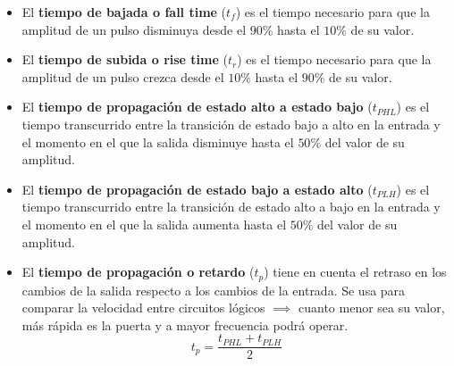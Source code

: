 \documentclass[10pt,a4paper]{article}
\begin{document}
	\begin{itemize}
		\item El \textbf{tiempo de bajada o fall time} ($t_f$) es el tiempo necesario para que la amplitud de un pulso disminuya desde el $90\%$ hasta el $10\%$ de su valor.
		\item El \textbf{tiempo de subida o rise time} ($t_r$) es el tiempo necesario para que la amplitud de un pulso crezca desde el $10\%$ hasta el $90\%$ de su valor.
		\item El \textbf{tiempo de propagación de estado alto a estado bajo} ($t_{PHL}$) es el tiempo transcurrido entre la transición de estado bajo a alto en la entrada y el momento en el que la salida disminuye hasta el $50\%$ del valor de su amplitud.
		\item El \textbf{tiempo de propagación de estado bajo a estado alto} ($t_{PLH}$) es el tiempo transcurrido entre la transición de estado alto a bajo en la entrada y el momento en el que la salida aumenta hasta el $50\%$ del valor de su amplitud.
		\item El \textbf{tiempo de propagación o retardo} ($t_p$) tiene en cuenta el retraso en los cambios de la salida respecto a los cambios de la entrada. Se usa para comparar la velocidad entre circuitos lógicos $\implies$ cuanto menor sea su valor, más rápida es la puerta y a mayor frecuencia podrá operar. $$t_p = \dfrac{t_{PHL} + t_{PLH}}{2}$$ 
	\end{itemize}
	
\end{document}
